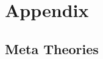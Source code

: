 \section{Appendix}\label{app:main}

\subsection{Meta Theories}\label{sec:theorem}

%  
%  
%  
%  
%  
%  
%  
